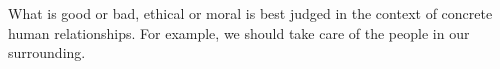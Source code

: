 What is good or bad, ethical or moral is best judged in the context of concrete human relationships.
For example, we should take care of the people in our surrounding.